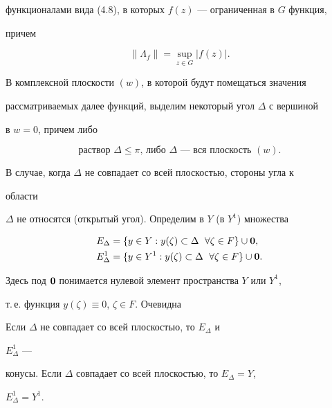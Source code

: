 функционалами вида (4.8), в которых $f(z)$ --- ограниченная в $G$ функция, 


причем 


\begin{equation} 


\|\Lambda_f\|=\sup_{z\in G} |f(z)|.


\end{equation} 


В комплексной плоскости $(w)$, в которой будут помещаться значения 


рассматриваемых далее функций, выделим некоторый угол $\Delta$ с вершиной 


в $w=0$, причем либо  


\begin{equation} 


\text{раствор $\Delta\le\pi$, либо $\Delta$ --- вся плоскость $(w)$}. 


\end{equation} 


В случае, когда $\Delta$ не совпадает со всей плоскостью, стороны угла к 


области 


$\Delta$ не относятся (открытый угол). Определим в $Y$ (в $Y^1$) множества 


\begin{equation} 


\begin{split} 


E_\Delta&=\{y\in Y:y(\zeta)\subset \Delta\ \; \forall 


\zeta\in F\}\cup{\bold 0}, \\ 


% 


E^1_\Delta&=\{y\in Y^1:y(\zeta)\subset \Delta 


\ \; \forall\zeta\in F\}\cup{\bold 0}. 


\end{split} 


\end{equation} 


Здесь под $\bold 0$ понимается нулевой элемент пространства $Y$ или $Y^1$, 


т.\,е. функция $y(\zeta)\equiv0$, $\zeta\in F$. Очевидна


 


\begin{lems} 


Если $\Delta$ не совпадает со всей плоскостью, то $E_\Delta$ и 


$E^1_\Delta$ --- 


конусы. Если $\Delta$ совпадает со всей плоскостью, то $E_\Delta=Y$, 


$E^1_\Delta=Y^1$. 


\end{lems} 


